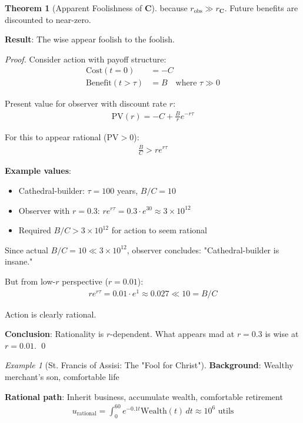 \documentclass[11pt,a4paper]{article}
\theoremstyle{definition}
\newtheorem{theorem}{Theorem}[section]
\theoremstyle{remark}
\newtheorem{example}{Example}[section]
\begin{document}
\begin{small}
\begin{enumerate}
\begin{theorem}[Apparent Foolishness of \(\mathbf{C}\)]
because \(r_{\text{obs}} \gg r_{\mathbf{C}}\). Future benefits are discounted to near-zero.

\textbf{Result}: The wise appear foolish to the foolish.
\end{theorem}

\begin{proof}
Consider action with payoff structure:
\begin{align}
\text{Cost}(t=0) &= -C \\
\text{Benefit}(t > \tau) &= B \quad \text{where } \tau \gg 0
\end{align}

Present value for observer with discount rate \(r\):
\begin{align}
\text{PV}(r) = -C + \frac{B}{r} e^{-r\tau}
\end{align}

For this to appear rational (\(\text{PV} > 0\)):
\begin{align}
\frac{B}{C} > r e^{r\tau}
\end{align}

\textbf{Example values}:
\begin{itemize}
    \item Cathedral-builder: \(\tau = 100\) years, \(B/C = 10\)
    \item Observer with \(r = 0.3\): \(r e^{r\tau} = 0.3 \cdot e^{30} \approx 3 \times 10^{12}\)
    \item Required \(B/C > 3 \times 10^{12}\) for action to seem rational
\end{itemize}

Since actual \(B/C = 10 \ll 3 \times 10^{12}\), observer concludes: "Cathedral-builder is insane."

But from low-\(r\) perspective (\(r = 0.01\)):
\begin{align}
r e^{r\tau} = 0.01 \cdot e^{1} \approx 0.027 \ll 10 = B/C
\end{align}

Action is clearly rational.

\textbf{Conclusion}: Rationality is \(r\)-dependent. What appears mad at \(r=0.3\) is wise at \(r=0.01\). \qed
\end{proof}

\begin{example}[St. Francis of Assisi: The "Fool for Christ"]
\textbf{Background}: Wealthy merchant's son, comfortable life

\textbf{Rational path}: Inherit business, accumulate wealth, comfortable retirement
\begin{align}
u_{\text{rational}} = \int_0^{60} e^{-0.1t} \text{Wealth}(t) \, dt \approx 10^6 \text{ utils}
\end{align}


\end{example}
\end{enumerate}
\end{small}
\end{document}
